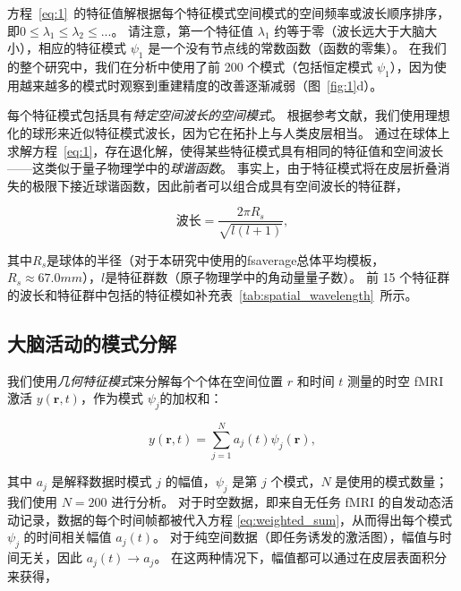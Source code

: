 \documentclass[lang=cn,a4paper,newtx,citestyle=gb7714-2015, bibstyle=gb7714-2015]{elegantpaper}
\begin{document}
方程~\ref{eq:1}~的特征值解根据每个特征模式空间模式的空间频率或波长顺序排序，即$ 0 \leq \lambda_1 \leq \lambda_2 \leq ... $。
请注意，第一个特征值 $ \lambda_1 $ 约等于零（波长远大于大脑大小），相应的特征模式 $ \psi_1 $ 是一个没有节点线的常数函数（函数的零集）。
在我们的整个研究中，我们在分析中使用了前 200 个模式（包括恒定模式 $ \psi_1 $），因为使用越来越多的模式时观察到重建精度的改善逐渐减弱（图~\ref{fig:1}d）。


每个特征模式包括具有\textit{特定空间波长的空间模式}。
根据参考文献\cite{robinson2016eigenmodes}，我们使用理想化的球形来近似特征模式波长，因为它在拓扑上与人类皮层相当。
通过在球体上求解方程~\ref{eq:1}，存在退化解，使得某些特征模式具有相同的特征值和空间波长——这类似于量子物理学中的\textit{球谐函数}。
事实上，由于特征模式将在皮层折叠消失的极限下接近球谐函数，因此前者可以组合成具有空间波长的特征群，


\begin{equation}
	\text{波长} = \frac{2 \pi R_s}
		{\sqrt{l(l+1)}},
\end{equation}

其中$R_s$是球体的半径（对于本研究中使用的fsaverage总体平均模板，$R_s \approx 67.0 mm$），$l$是特征群数（原子物理学中的角动量量子数）。
前 15 个特征群的波长和特征群中包括的特征模如补充表~\ref{tab:spatial_wavelength}~所示。


\subsection{大脑活动的模式分解} \label{sec:modal_decomposition}

我们使用\textit{几何特征模式}来分解每个个体在空间位置 $ r $ 和时间 $ t $ 测量的时空 fMRI 激活 $ y(\textbf{r}, t) $，作为模式 $ \psi_j $的加权和：

\begin{equation}\label{eq:weighted_sum}
	y(\textbf{r}, t) = \sum_{j=1}^{N} a_j(t) \psi_j(\textbf{r}),
\end{equation}

其中 $ a_j  $ 是解释数据时模式 $ j $ 的幅值，$ \psi_j $ 是第 $ j $ 个模式，$ N $ 是使用的模式数量；
我们使用 $ N = 200 $ 进行分析。
对于时空数据，即来自无任务 fMRI 的自发动态活动记录，数据的每个时间帧都被代入方程 \ref{eq:weighted_sum}，从而得出每个模式 $ \psi_j $ 的时间相关幅值 $ a_j(t) $。
对于纯空间数据（即任务诱发的激活图），幅值与时间无关，因此 $ a_j(t) \rightarrow a_j $。
在这两种情况下，幅值都可以通过在皮层表面积分来获得，
\end{document}
